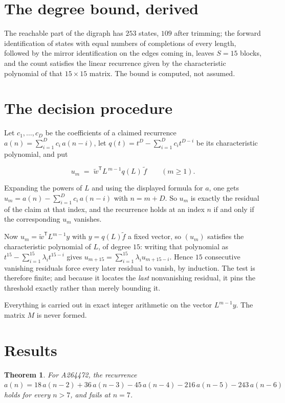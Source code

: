\documentclass[11pt]{article}
\newtheorem{theorem}{Theorem}
\theoremstyle{definition}
\begin{document}
\section{The degree bound, derived}

The reachable part of the digraph has $253$ states, $109$ after trimming; the forward identification of states with equal numbers of completions of every length, followed by the mirror identification on the edges coming in, leaves $S = 15$ blocks, and the count satisfies the linear recurrence given by the characteristic polynomial of that $15\times15$ matrix. The bound is computed, not assumed.

\section{The decision procedure}

Let $c_1,\dots,c_D$ be the coefficients of a claimed recurrence $a(n) = \sum_{i=1}^{D} c_i\,a(n-i)$, let $q(t) = t^{D} - \sum_{i=1}^{D} c_i t^{D-i}$ be its characteristic polynomial, and put

\[u_m \;=\; \tilde w^{\mathsf T} L^{\,m-1} q(L)\,\tilde f \qquad (m \ge 1).\]

Expanding the powers of $L$ and using the displayed formula for $a$, one gets $u_m = a(n) - \sum_{i=1}^{D} c_i\,a(n-i)$ with $n = m + D$. So $u_m$ is exactly the residual of the claim at that index, and the recurrence holds at an index $n$ if and only if the corresponding $u_m$ vanishes.

Now $u_m = \tilde w^{\mathsf T} L^{m-1} y$ with $y = q(L)\tilde f$ a fixed vector, so $(u_m)$ satisfies the characteristic polynomial of $L$, of degree $15$: writing that polynomial as $t^{15} - \sum_{i=1}^{15} \lambda_i t^{15-i}$ gives $u_{m+15} = \sum_{i=1}^{15} \lambda_i u_{m+15-i}$. Hence $15$ consecutive vanishing residuals force every later residual to vanish, by induction. The test is therefore finite; and because it locates the {\itshape last} nonvanishing residual, it pins the threshold exactly rather than merely bounding it.

Everything is carried out in exact integer arithmetic on the vector $L^{m-1}y$. The matrix $M$ is never formed.

\section{Results}

\begin{theorem} For A264472, the recurrence $a(n) = 18\,a(n-2) + 36\,a(n-3) - 45\,a(n-4) - 216\,a(n-5) - 243\,a(n-6)$ holds for every $n > 7$, and fails at $n = 7$.\end{theorem}
\end{document}
